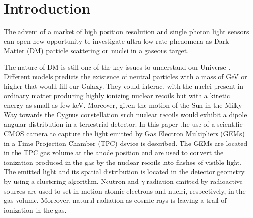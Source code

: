\documentclass[12pt]{iopart}
\begin{document}
%
%
%
% 
%



\section{Introduction}


The advent of a market of high position resolution and single photon
light sensors can open new opportunity to investigate ultra-low rate
phenomena as Dark Matter (DM) particle scattering on nuclei in a
gaseous target.

The nature of DM is still one of the key issues to understand our
Universe \cite{PhysRevLett.39.165,Undagoitia_2015}.  Different models
predicts the existence of neutral particles with a mass of GeV or
higher that would fill our Galaxy. They could interact with the nuclei
present in ordinary matter producing highly ionizing nuclear recoils
but with a kinetic energy as small as few keV. Moreover, given the
motion of the Sun in the Milky Way towards the Cygnus constellation
such nuclear recoils would exhibit a dipole angular distribution in a
terrestrial detector.  In this paper the use of a scientific CMOS
camera to capture the light emitted by Gas Electron Multipliers (GEMs)
in a Time Projection Chamber (TPC) device is described. The GEMs are
located in the TPC gas volume at the anode position and are used to
convert the ionization produced in the gas by the nuclear recoils into
flashes of visible light. The emitted light and its spatial
distribution is located in the detector geometry by using a clustering
algorithm. Neutron and $\gamma$ radiation emitted by radioactive
sources are used to set in motion atomic electrons and nuclei,
respectively, in the gas volume. Moreover, natural radiation as cosmic
rays is leaving a trail of ionization in the gas.
\end{document}
